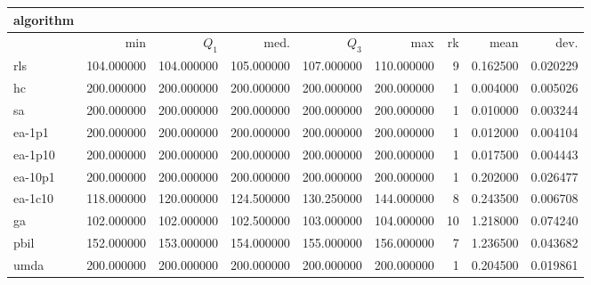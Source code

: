 \begin{tabular}{@{}l*{5}{>{{}}N{3}{0}}>{{}}N{2}{0}N{1}{3}N{1}{3}@{}}
\toprule
{algorithm} &  &  \\
\midrule
& {min} & {$Q_1$} & {med.} & {$Q_3$} & {max} & {rk} & {mean} & {dev.} \\
\midrule
rls & 104.000000 & 104.000000 & 105.000000 & 107.000000 & 110.000000 & 9 & 0.162500 & 0.020229 \\
 hc & {\color{blue}} 200.000000 & {\color{blue}} 200.000000 & {\color{blue}} 200.000000 & {\color{blue}} 200.000000 & {\color{blue}} 200.000000 & 1 & 0.004000 & 0.005026 \\
 sa & {\color{blue}} 200.000000 & {\color{blue}} 200.000000 & {\color{blue}} 200.000000 & {\color{blue}} 200.000000 & {\color{blue}} 200.000000 & 1 & 0.010000 & 0.003244 \\
 ea-1p1 & {\color{blue}} 200.000000 & {\color{blue}} 200.000000 & {\color{blue}} 200.000000 & {\color{blue}} 200.000000 & {\color{blue}} 200.000000 & 1 & 0.012000 & 0.004104 \\
 ea-1p10 & {\color{blue}} 200.000000 & {\color{blue}} 200.000000 & {\color{blue}} 200.000000 & {\color{blue}} 200.000000 & {\color{blue}} 200.000000 & 1 & 0.017500 & 0.004443 \\
 ea-10p1 & {\color{blue}} 200.000000 & {\color{blue}} 200.000000 & {\color{blue}} 200.000000 & {\color{blue}} 200.000000 & {\color{blue}} 200.000000 & 1 & 0.202000 & 0.026477 \\
 ea-1c10 & 118.000000 & 120.000000 & 124.500000 & 130.250000 & 144.000000 & 8 & 0.243500 & 0.006708 \\
 ga & 102.000000 & 102.000000 & 102.500000 & 103.000000 & 104.000000 & 10 & 1.218000 & 0.074240 \\
 pbil & 152.000000 & 153.000000 & 154.000000 & 155.000000 & 156.000000 & 7 & 1.236500 & 0.043682 \\
 umda & {\color{blue}} 200.000000 & {\color{blue}} 200.000000 & {\color{blue}} 200.000000 & {\color{blue}} 200.000000 & {\color{blue}} 200.000000 & 1 & 0.204500 & 0.019861 \\
 \bottomrule
\end{tabular}
